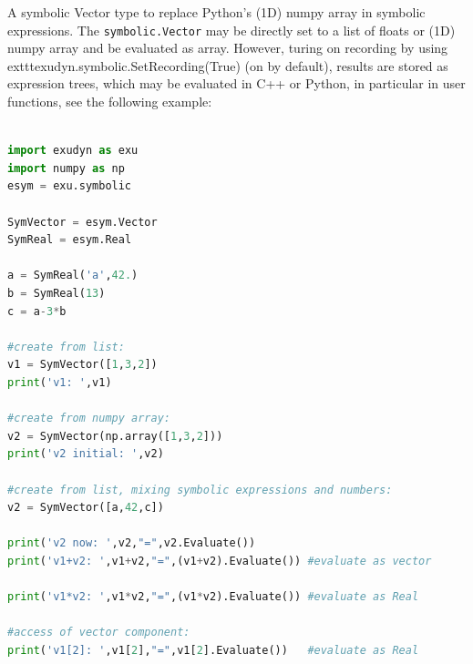A symbolic Vector type to replace Python's (1D) numpy array in symbolic expressions. The \texttt{symbolic.Vector} may be directly set to a list of floats or (1D) numpy array and be evaluated as array. However, turing on recording by using 	exttt{exudyn.symbolic.SetRecording(True)} (on by default), results are stored as expression trees, which may be evaluated in C++ or Python, in particular in user functions, see the following example:
\pythonstyle
\begin{lstlisting}[language=Python, firstnumber=1]

import exudyn as exu
import numpy as np
esym = exu.symbolic

SymVector = esym.Vector
SymReal = esym.Real 

a = SymReal('a',42.)
b = SymReal(13)
c = a-3*b

#create from list:
v1 = SymVector([1,3,2])
print('v1: ',v1)

#create from numpy array:
v2 = SymVector(np.array([1,3,2]))
print('v2 initial: ',v2)

#create from list, mixing symbolic expressions and numbers:
v2 = SymVector([a,42,c])

print('v2 now: ',v2,"=",v2.Evaluate())
print('v1+v2: ',v1+v2,"=",(v1+v2).Evaluate()) #evaluate as vector

print('v1*v2: ',v1*v2,"=",(v1*v2).Evaluate()) #evaluate as Real

#access of vector component:
print('v1[2]: ',v1[2],"=",v1[2].Evaluate())   #evaluate as Real
\end{lstlisting}


